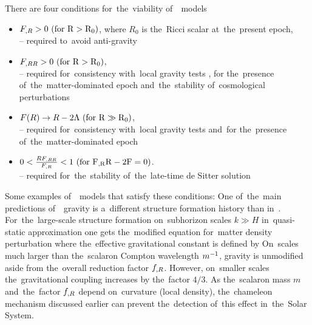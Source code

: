 There are four conditions for~the~viability of~\fR\ models \parencite{Amendola_2007}
\begin{itemize}
	\item $F_{,R}>0\ (\rm{for\ } R>R_0)$, where $R_0$ is the~Ricci scalar at~the~present epoch,\\
	-- required to~avoid anti-gravity \parencite{2010deto.book.....A}\\
	\item $F_{,RR}>0\ (\rm{for\ } R>R_0)$,\\
	-- required for~consistency with~local gravity tests \parencite{2005gr.qc.....5136O}, for the~presence of~the~matter-dominated epoch \parencite{2007PhRvL..98m1302A} and~the~stability of~cosmological perturbations \parencite{2007PhRvD..75d4004S}\\
	\item $F(R)\rightarrow R-2\Lambda\ (\rm{for\ } R\gg R_0)$,\\
	-- required for~consistency with~local gravity tests \parencite{2008PhRvD..77b3507T} and~for the~presence of~the~matter-dominated epoch \parencite{Amendola_2007}\\
	\item $0<\frac{RF\RR}{F\R}<1\ (\rm{for\ } F\R R-2F=0)$.\\
	-- required for~the~stability of~the~late-time de Sitter solution \parencite{1988PhLB..202..198M}
\end{itemize}
Some examples of~\fR\ models that satisfy these conditions:
One of~the~main predictions of~\fR\ gravity is a~different structure formation history than in~\LCDM. For~the~large-scale structure formation on~subhorizon scales \mbox{$k\gg H$} in~quasi-static approximation one gets the~modified equation for~matter density perturbation \parencite{2011RSPTA.369.4947B}
where the~effective gravitational constant is defined by
On~scales much larger than the~scalaron Compton wavelength $m^{-1}$, gravity is unmodified aside from the~overall reduction factor $f_{,R}$. However, on~smaller scales the~gravitational coupling increases by the~factor $4/3$. As the~scalaron mass $m$ and~the~factor $f_{,R}$ depend on~curvature (local density), the~chameleon mechanism discussed earlier can prevent the~detection of~this effect in~the~Solar System.

